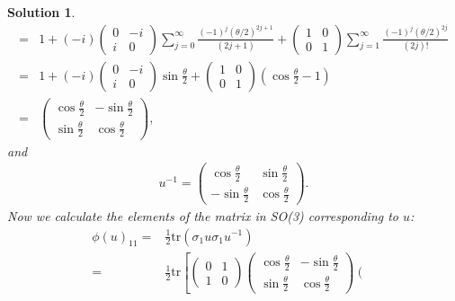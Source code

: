 \documentclass[UTF8,10pt,a4paper]{article}
\theoremstyle{Problem}
\theoremstyle{Solution}
\newtheorem*{sol}{Solution}
\begin{document}
\begin{sol}
\begin{align}
        \nonumber=&1+(-i)\left(\begin{matrix}
            0&-i\\
            i&0
        \end{matrix}\right)\sum_{j=0}^{\infty}\frac{(-1)^j(\theta/2)^{2j+1}}{(2j+1)}+\left(\begin{matrix}
            1&0\\
            0&1
        \end{matrix}\right)\sum_{j=1}^{\infty}\frac{(-1)^j(\theta/2)^{2j}}{(2j)!}\\
        \nonumber=&1+(-i)\left(\begin{matrix}
            0&-i\\
            i&0
        \end{matrix}\right)\sin\frac{\theta}{2}+\left(\begin{matrix}
            1&0\\
            0&1
        \end{matrix}\right)(\cos\frac{\theta}{2}-1)\\
        =&\left(\begin{matrix}
            \cos\frac{\theta}{2}&-\sin\frac{\theta}{2}\\
            \sin\frac{\theta}{2}&\cos\frac{\theta}{2}
        \end{matrix}\right),
    \end{align}
    and
    \begin{align}
        u^{-1}=\left(\begin{matrix}
            \cos\frac{\theta}{2}&\sin\frac{\theta}{2}\\
            -\sin\frac{\theta}{2}&\cos\frac{\theta}{2}
        \end{matrix}\right).
    \end{align}
    Now we calculate the elements of the matrix in SO(3) corresponding to $u$:
    \begin{align}
        \nonumber\phi(u)_{11}=&\frac{1}{2}\text{tr}(\sigma_1u\sigma_1u^{-1})\\
        \nonumber=&\frac{1}{2}\text{tr}\left[\left(\begin{matrix}
            0&1\\
            1&0
        \end{matrix}\right)\left(\begin{matrix}
            \cos\frac{\theta}{2}&-\sin\frac{\theta}{2}\\
            \sin\frac{\theta}{2}&\cos\frac{\theta}{2}
        \end{matrix}\right)\left(\begin{matrix}

\end{matrix}
\end{align}
\end{sol}
\end{document}
